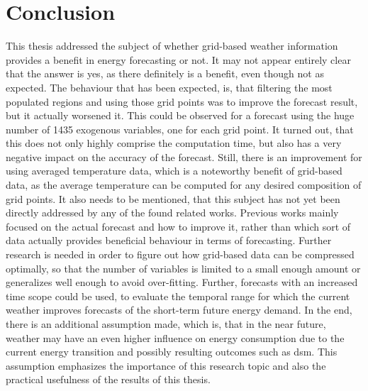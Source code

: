 \chapter{Conclusion}
\label{ch:Conclusion}

This thesis addressed the subject of whether grid-based weather information provides a benefit in energy forecasting or not. It may not appear entirely clear that the answer is yes, as there definitely is a benefit, even though not as expected. The behaviour that has been expected, is, that \eg filtering the most populated regions and using those grid points was to improve the forecast result, but it actually worsened it. This could be observed for a forecast using the huge number of 1435 exogenous variables, one for each grid point. It turned out, that this does not only highly comprise the computation time, but also has a very negative impact on the accuracy of the forecast. Still, there is an improvement for using \eg averaged temperature data, which is a noteworthy benefit of grid-based data, as the average temperature can be computed for any desired composition of grid points. It also needs to be mentioned, that this subject has not yet been directly addressed by any of the found related works. Previous works mainly focused on the actual forecast and how to improve it, rather than which sort of data actually provides beneficial behaviour in terms of forecasting. Further research is needed in order to figure out how grid-based data can be compressed optimally, so that the number of variables is limited to a small enough amount or generalizes well enough to avoid over-fitting. Further, forecasts with an increased time scope could be used, to evaluate the temporal range for which the current weather improves forecasts of the short-term future energy demand. In the end, there is an additional assumption made, which is, that in the near future, weather may have an even higher influence on energy consumption due to the current energy transition and possibly resulting outcomes such as \gls{dsm}. This assumption emphasizes the importance of this research topic and also the practical usefulness of the results of this thesis.\\



